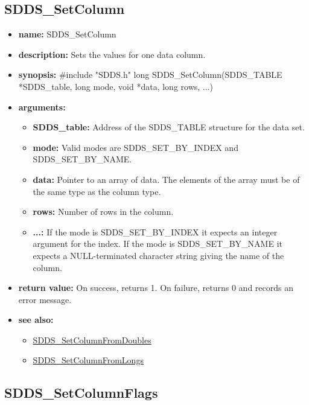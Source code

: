 \documentclass[11pt]{article}
\newcommand{\progref}[1]{\hyperref{SDDS_#1}{{\tt SDDS\_#1} (}{)}{SDDS_#1}}
\begin{document}
\subsection{SDDS\_SetColumn}
\label{SDDS_SetColumn}

\begin{itemize}
\item {\bf name:}\newline
SDDS\_SetColumn
\item {\bf description:}\newline
Sets the values for one data column.
\item {\bf synopsis:} \#include "SDDS.h"\newline
long SDDS\_SetColumn(SDDS\_TABLE *SDDS\_table, long mode, void *data, long rows, ...)
\item {\bf arguments:}
\begin{itemize}
\item {\bf SDDS\_table:} Address of the SDDS\_TABLE structure for the data set.
\item {\bf mode:} Valid modes are SDDS\_SET\_BY\_INDEX and SDDS\_SET\_BY\_NAME.
\item {\bf data:} Pointer to an array of data. The elements of the array must be of the same type as the column type.
\item {\bf rows:} Number of rows in the column.
\item {\bf ...:} If the mode is SDDS\_SET\_BY\_INDEX it expects an integer argument for the index. If the mode is SDDS\_SET\_BY\_NAME it expects a NULL-terminated character string giving the name of the column.
\end{itemize}
\item {\bf return value:}\newline
On success, returns 1. On failure, returns 0 and records an error message.
\item {\bf see also:}
\begin{itemize}
\item \progref{SetColumnFromDoubles}
\item \progref{SetColumnFromLongs}
\end{itemize}
\end{itemize}

\subsection{SDDS\_SetColumnFlags}
\label{SDDS_SetColumnFlags}
\end{document}
